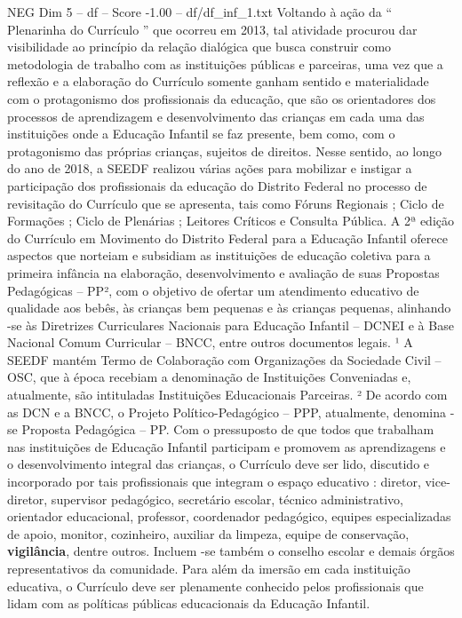 \begin{textsample}{NEG Dim 5 – df – Score -1.00 – df/df\_inf\_1.txt}
Voltando à ação da “ Plenarinha do Currículo ” que ocorreu em 2013, tal atividade procurou dar visibilidade ao princípio da relação dialógica que busca construir como metodologia de trabalho com as instituições públicas e parceiras, uma vez que a reflexão e a elaboração do Currículo somente ganham sentido e materialidade com o protagonismo dos profissionais da educação, que são os orientadores dos processos de aprendizagem e desenvolvimento das crianças em cada uma das instituições onde a Educação Infantil se faz presente, bem como, com o protagonismo das próprias crianças, sujeitos de direitos.
Nesse sentido, ao longo do ano de 2018, a SEEDF realizou várias ações para mobilizar e instigar a participação dos profissionais da educação do Distrito Federal no processo de revisitação do Currículo que se apresenta, tais como Fóruns Regionais ; Ciclo de Formações ; Ciclo de Plenárias ; Leitores Críticos e Consulta Pública.
A 2ª edição do Currículo em Movimento do Distrito Federal para a Educação Infantil oferece aspectos que norteiam e subsidiam as instituições de educação coletiva para a primeira infância na elaboração, desenvolvimento e avaliação de suas Propostas Pedagógicas – PP², com o objetivo de ofertar um atendimento educativo de qualidade aos bebês, às crianças bem pequenas e às crianças pequenas, alinhando -se às Diretrizes Curriculares Nacionais para Educação Infantil – DCNEI e à Base Nacional Comum Curricular – BNCC, entre outros documentos legais. ¹ A SEEDF mantém Termo de Colaboração com Organizações da Sociedade Civil – OSC, que à época recebiam a denominação de Instituições Conveniadas e, atualmente, são intituladas Instituições Educacionais Parceiras. ² De acordo com as DCN e a BNCC, o Projeto Político-Pedagógico – PPP, atualmente, denomina -se Proposta Pedagógica – PP.
Com o pressuposto de que todos que trabalham nas instituições de Educação Infantil participam e promovem as aprendizagens e o desenvolvimento integral das crianças, o Currículo deve ser lido, discutido e incorporado por tais profissionais que integram o espaço educativo : diretor, vice-diretor, supervisor pedagógico, secretário escolar, técnico administrativo, orientador educacional, professor, coordenador pedagógico, equipes especializadas de apoio, monitor, cozinheiro, auxiliar da limpeza, equipe de conservação, \textbf{vigilância}, dentre outros.
Incluem -se também o conselho escolar e demais órgãos representativos da comunidade.
Para além da imersão em cada instituição educativa, o Currículo deve ser plenamente conhecido pelos profissionais que lidam com as políticas públicas educacionais da Educação Infantil.

\end{textsample}
